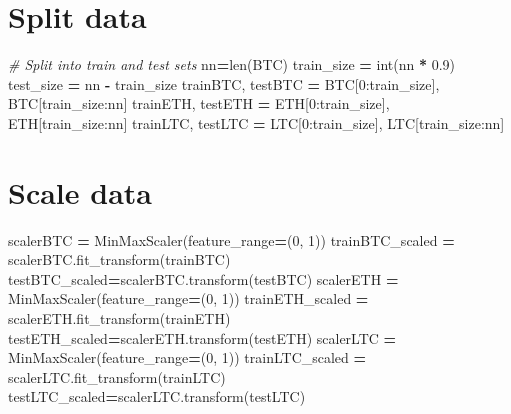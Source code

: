 \documentclass[
]{article}
\newenvironment{Shaded}{\begin{snugshade}}{\end{snugshade}}
\newcommand{\BuiltInTok}[1]{#1}
\newcommand{\CommentTok}[1]{\textcolor[rgb]{0.56,0.35,0.01}{\textit{#1}}}
\newcommand{\DecValTok}[1]{\textcolor[rgb]{0.00,0.00,0.81}{#1}}
\newcommand{\FloatTok}[1]{\textcolor[rgb]{0.00,0.00,0.81}{#1}}
\newcommand{\NormalTok}[1]{#1}
\newcommand{\OperatorTok}[1]{\textcolor[rgb]{0.81,0.36,0.00}{\textbf{#1}}}
\begin{document}
\section{Split data}\label{split-data}

\begin{Shaded}
\begin{Highlighting}[]
\CommentTok{\# Split into train and test sets}
\NormalTok{nn}\OperatorTok{=}\BuiltInTok{len}\NormalTok{(BTC)}
\NormalTok{train\_size }\OperatorTok{=} \BuiltInTok{int}\NormalTok{(nn }\OperatorTok{*} \FloatTok{0.9}\NormalTok{)}
\NormalTok{test\_size }\OperatorTok{=}\NormalTok{ nn }\OperatorTok{{-}}\NormalTok{ train\_size}
\NormalTok{trainBTC, testBTC }\OperatorTok{=}\NormalTok{ BTC[}\DecValTok{0}\NormalTok{:train\_size], BTC[train\_size:nn]}
\NormalTok{trainETH, testETH }\OperatorTok{=}\NormalTok{ ETH[}\DecValTok{0}\NormalTok{:train\_size], ETH[train\_size:nn]}
\NormalTok{trainLTC, testLTC }\OperatorTok{=}\NormalTok{ LTC[}\DecValTok{0}\NormalTok{:train\_size], LTC[train\_size:nn]}
\end{Highlighting}
\end{Shaded}

\section{Scale data}\label{scale-data}

\begin{Shaded}
\begin{Highlighting}[]
\NormalTok{scalerBTC }\OperatorTok{=}\NormalTok{ MinMaxScaler(feature\_range}\OperatorTok{=}\NormalTok{(}\DecValTok{0}\NormalTok{, }\DecValTok{1}\NormalTok{))}
\NormalTok{trainBTC\_scaled }\OperatorTok{=}\NormalTok{ scalerBTC.fit\_transform(trainBTC)}
\NormalTok{testBTC\_scaled}\OperatorTok{=}\NormalTok{scalerBTC.transform(testBTC)}
\NormalTok{scalerETH }\OperatorTok{=}\NormalTok{ MinMaxScaler(feature\_range}\OperatorTok{=}\NormalTok{(}\DecValTok{0}\NormalTok{, }\DecValTok{1}\NormalTok{))}
\NormalTok{trainETH\_scaled }\OperatorTok{=}\NormalTok{ scalerETH.fit\_transform(trainETH)}
\NormalTok{testETH\_scaled}\OperatorTok{=}\NormalTok{scalerETH.transform(testETH)}
\NormalTok{scalerLTC }\OperatorTok{=}\NormalTok{ MinMaxScaler(feature\_range}\OperatorTok{=}\NormalTok{(}\DecValTok{0}\NormalTok{, }\DecValTok{1}\NormalTok{))}
\NormalTok{trainLTC\_scaled }\OperatorTok{=}\NormalTok{ scalerLTC.fit\_transform(trainLTC)}
\NormalTok{testLTC\_scaled}\OperatorTok{=}\NormalTok{scalerLTC.transform(testLTC)}
\end{Highlighting}
\end{Shaded}
\end{document}
